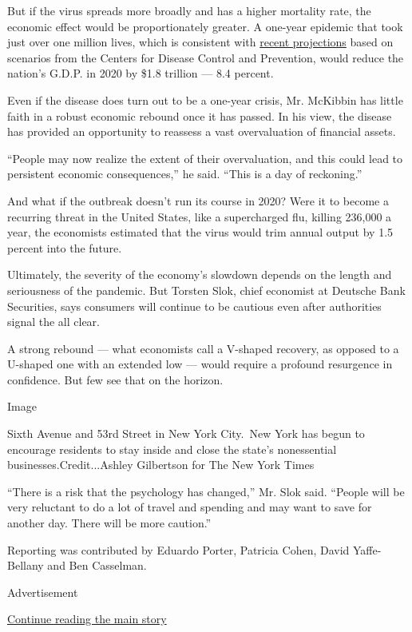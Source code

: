 But if the virus spreads more broadly and has a higher mortality rate,
the economic effect would be proportionately greater. A one-year
epidemic that took just over one million lives, which is consistent with
\href{https://www.nytimes3xbfgragh.onion/2020/03/13/us/coronavirus-deaths-estimate.html}{recent
projections} based on scenarios from the Centers for Disease Control and
Prevention, would reduce the nation's G.D.P. in 2020 by \$1.8 trillion
--- 8.4 percent.

Even if the disease does turn out to be a one-year crisis, Mr. McKibbin
has little faith in a robust economic rebound once it has passed. In his
view, the disease has provided an opportunity to reassess a vast
overvaluation of financial assets.

``People may now realize the extent of their overvaluation, and this
could lead to persistent economic consequences,'' he said. ``This is a
day of reckoning.''

And what if the outbreak doesn't run its course in 2020? Were it to
become a recurring threat in the United States, like a supercharged flu,
killing 236,000 a year, the economists estimated that the virus would
trim annual output by 1.5 percent into the future.

Ultimately, the severity of the economy's slowdown depends on the length
and seriousness of the pandemic. But Torsten Slok, chief economist at
Deutsche Bank Securities, says consumers will continue to be cautious
even after authorities signal the all clear.

A strong rebound --- what economists call a V-shaped recovery, as
opposed to a U-shaped one with an extended low --- would require a
profound resurgence in confidence. But few see that on the horizon.

Image

Sixth Avenue and 53rd Street in New York City.~New York has begun to
encourage residents to stay inside and close the state's nonessential
businesses.Credit...Ashley Gilbertson for The New York Times

``There is a risk that the psychology has changed,'' Mr. Slok said.
``People will be very reluctant to do a lot of travel and spending and
may want to save for another day. There will be more caution.''

Reporting was contributed by Eduardo Porter, Patricia Cohen, David
Yaffe-Bellany and Ben Casselman.

Advertisement

\protect\hyperlink{after-bottom}{Continue reading the main story}

